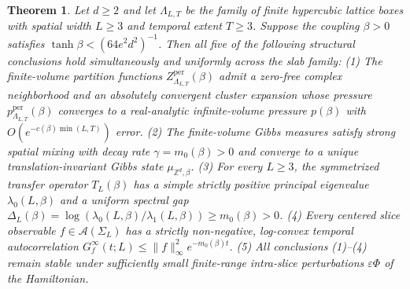 \documentclass[11pt]{article}
\newtheorem{theorem}{Theorem}[section]
\theoremstyle{definition}
\begin{document}
\begin{theorem}
\label{thm:s10-main}
Let $d \ge 2$ and let $\Lambda_{L,T}$ be the family of finite hypercubic lattice
boxes with spatial width $L \ge 3$ and temporal extent $T \ge 3$. Suppose the
coupling $\beta > 0$ satisfies $\tanh \beta < (64 e^2 d^2)^{-1}$. Then all five of
the following structural conclusions hold simultaneously and uniformly across the
slab family: (1) The finite-volume partition functions
$Z_{\Lambda_{L,T}}^{\mathrm{per}}(\beta)$ admit a zero-free complex neighborhood and
an absolutely convergent cluster expansion whose pressure
$p_{\Lambda_{L,T}}^{\mathrm{per}}(\beta)$ converges to a real-analytic
infinite-volume pressure $p(\beta)$ with $O(e^{-c(\beta) \min(L, T)})$ error. (2)
The finite-volume Gibbs measures satisfy strong spatial mixing with decay rate
$\gamma = m_0(\beta) > 0$ and converge to a unique translation-invariant Gibbs state
$\mu_{\mathbb{Z}^d, \beta}$. (3) For every $L \ge 3$, the symmetrized transfer
operator $T_L(\beta)$ has a simple strictly positive principal eigenvalue
$\lambda_0(L, \beta)$ and a uniform spectral gap $\Delta_L(\beta) =
\log(\lambda_0(L, \beta) / \lambda_1(L, \beta)) \ge m_0(\beta) > 0$. (4) Every
centered slice observable $f \in \mathcal{A}(\Sigma_L)$ has a strictly non-negative,
log-convex temporal autocorrelation $G_f^\infty(t; L) \le \|f\|_\infty^2
e^{-m_0(\beta) t}$. (5) All conclusions (1)--(4) remain stable under sufficiently
small finite-range intra-slice perturbations $\varepsilon \Phi$ of the Hamiltonian.
\end{theorem}
\end{document}

